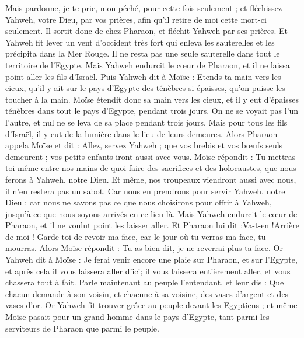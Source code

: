 \begin{multicols}{2}
Mais pardonne, je te prie, mon péché, pour cette fois seulement ; et fléchissez Yahweh, votre Dieu, par vos prières, afin  qu'il retire de moi cette mort-ci seulement.
Il sortit donc de chez Pharaon, et fléchit Yahweh par ses prières.
Et Yahweh fit lever un vent d'occident très fort qui enleva les sauterelles et les précipita dans la Mer Rouge. Il ne resta pas une seule sauterelle dans tout le territoire de l'Egypte.
Mais Yahweh endurcit le cœur de Pharaon, et il ne laissa point aller les fils d'Israël.
Puis Yahweh dit à Moïse : Etends ta main vers les cieux, qu'il y ait sur le pays d'Egypte des ténèbres si épaisses,  qu'on puisse les toucher à la main.
Moïse étendit donc sa main vers les cieux, et il y eut d'épaisses ténèbres dans tout le pays d'Egypte, pendant trois jours.
On ne se voyait pas l'un l'autre, et nul ne se leva de sa place pendant trois jours. Mais pour tous les fils d'Israël, il y eut de la lumière dans le lieu de leurs demeures.
Alors Pharaon appela Moïse et dit : Allez, servez Yahweh ; que vos brebis et vos bœufs seuls demeurent ; vos petits enfants iront aussi avec vous.
Moïse répondit : Tu mettras toi-même entre nos mains de quoi faire des sacrifices et des holocaustes, que nous ferons à Yahweh, notre Dieu.
Et même, nos troupeaux viendront aussi avec nous, il n'en restera pas un sabot. Car nous en prendrons pour servir Yahweh, notre Dieu ; car nous ne savons pas ce que nous choisirons pour offrir à Yahweh, jusqu’à ce que nous soyons arrivés en ce lieu là.
Mais Yahweh endurcit le cœur de Pharaon, et il ne voulut point les laisser aller.
Et Pharaon lui dit :Va-t-en !Arrière de moi ! Garde-toi de revoir ma face, car le jour où tu verras ma face, tu mourras.
Alors Moïse répondit : Tu as bien dit, je ne reverrai plus ta face.
\VerseOne{}Or Yahweh dit à Moïse : Je ferai venir encore une plaie sur Pharaon, et sur l'Egypte, et après cela il vous laissera aller d'ici; il vous laissera entièrement aller, et vous chassera tout à fait.
Parle maintenant au peuple l'entendant, et leur dis : Que chacun demande à son voisin, et chacune à sa voisine, des vases d'argent et des vases d'or.
Or Yahweh fit trouver grâce au peuple devant les Egyptiens ; et même Moïse pasait pour un grand homme dans le pays d'Egypte, tant parmi les serviteurs de Pharaon que parmi le peuple.

\end{multicols}
